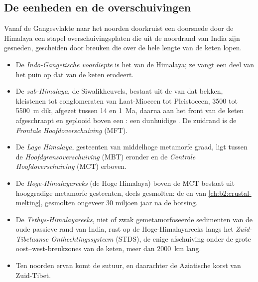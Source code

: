 \subsection{De eenheden en de overschuivingen}

Vanaf de Gangesvlakte naar het noorden doorkruist een doorsnede door de Himalaya een stapel overschuivingsplaten
die uit de noordrand van India zijn gesneden, gescheiden door breuken die over de hele lengte van de keten lopen.
\begin{itemize}
\item De \emph{Indo-Gangetische voordiepte} is het  van de Himalaya; ze vangt een deel van
het puin op dat van de keten erodeert.
\item De \emph{sub-Himalaya}, de Siwalikheuvels, bestaat uit de  van dat bekken,
kleistenen tot conglomeraten van Laat-Mioceen tot Pleistoceen, 3500 tot \qty{5500}{m} dik,
afgezet tussen 14 en \qty{1}{Ma}, daarna aan het front van de keten afgeschraapt en geplooid boven een
: een dunhuidige . De zuidrand is de \emph{Frontale
Hoofdoverschuiving} (MFT).
\item De \emph{Lage Himalaya}, gesteenten van middelhoge metamorfe graad, ligt tussen de
\emph{Hoofdgrensoverschuiving} (MBT) eronder en de \emph{Centrale Hoofdoverschuiving} (MCT) erboven.
\item De \emph{Hoge-Himalayareeks} (de Hoge Himalaya) boven de MCT bestaat uit
hooggradige metamorfe gesteenten, deels gesmolten: de  en  van
\cref{ch:b2:crustal-melting}, gesmolten ongeveer 30 miljoen jaar na de botsing.
\item De \emph{Tethys-Himalayareeks}, niet of zwak gemetamorfoseerde
sedimenten van de oude passieve rand van India, rust op de Hoge-Himalayareeks langs het
\emph{Zuid-Tibetaanse Onthechtingssysteem} (STDS), de enige afschuiving onder de grote
oost--west-breukzones van de keten, meer dan \qty{2000}{km} lang.
\item Ten noorden ervan komt de sutuur, en daarachter de Aziatische korst van Zuid-Tibet.
\end{itemize}

